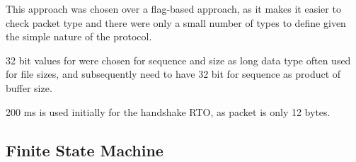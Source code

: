 \documentclass[12pt]{article}
\begin{document}
This approach was chosen over a flag-based approach, as it makes it easier to check packet type and there were only a small number of types to define given the simple nature of the protocol.

32 bit values for were chosen for sequence and size as long data type often used for file sizes, and subsequently need to have 32 bit for sequence as product of buffer size. 

200 ms is used initially for the handshake RTO, as packet is only 12 bytes.

\subsection{Finite State Machine}




\end{document}
